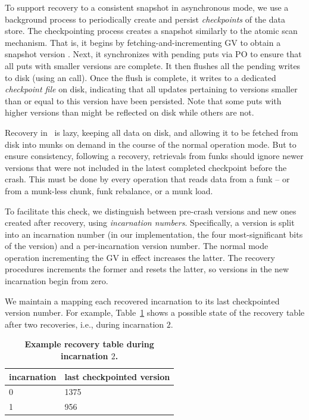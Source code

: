 To support recovery to a consistent snapshot in asynchronous mode, we use a background process to
periodically create and persist \emph{checkpoints} of the data store.
The checkpointing process creates a snapshot similarly to the atomic scan mechanism. That is, 
it begins by fetching-and-incrementing GV to obtain a 
 snapshot version .  Next, 
it synchronizes with pending puts via PO to ensure that all puts with smaller versions are complete. 
It then flushes all the pending writes to disk (using an  call). 
Once the flush is complete, it writes  to a dedicated \emph{checkpoint file} on disk,
indicating that all updates pertaining to versions smaller than or equal to this version have been persisted.
Note that some puts with higher versions than  might be reflected on disk while others are not. 

Recovery in \sys\ is lazy, keeping all data on disk, and 
allowing it to be fetched from disk into munks  on demand in the course of the normal operation mode. 
But to ensure consistency, following a recovery,  
retrievals from funks should ignore newer versions that were not included in the latest completed checkpoint before the crash. This must be done by every operation that reads data from a funk --  or  from a munk-less chunk, funk rebalance,  or a munk load. 

To facilitate this check, 
we distinguish between pre-crash versions and new ones created after recovery, using \emph{incarnation numbers}. Specifically, a version is split into an incarnation number (in our implementation, the four most-significant bits of the version) and a per-incarnation version number. The normal mode operation incrementing the GV in effect increases the latter. The recovery procedures increments the former and resets the latter, so 
versions in the new incarnation begin from zero. 

We maintain a  mapping each recovered incarnation to its last checkpointed version number. 
For example, Table~\ref{table:recovery} shows a possible state of the recovery table after two recoveries, i.e., during incarnation $2$. 

\begin{table}[h]
\begin{center}
\begin{tabular}{ll}
incarnation & last checkpointed version \\
\hline
0 & 1375\\
1 &  956\\
\end{tabular}
\end{center}
\caption{\bf{Example recovery table during incarnation $2$.}}
\label{table:recovery}
\end{table} 
 
